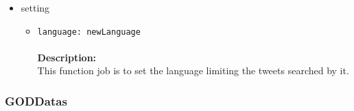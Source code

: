 \begin{itemize}
\begin{itemize}
\begin{itemize}
\item setting
\label{sec-1-4-1-3-3-5}%
\begin{itemize}
\item \verb~language: newLanguage~\\\\
\textbf{Description:}\\
      This function job is to set the language limiting the tweets searched by it.
\end{itemize}



\end{itemize} %
\end{itemize} %
\end{itemize} %
\subsubsection{GODDatas}
\label{sec-1-4-2}

